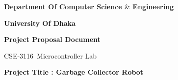 \documentclass[12pt]{article}
\begin{document}
\vspace{\baselineskip}
\vspace{\baselineskip}
\vspace{\baselineskip}
\vspace{\baselineskip}
\vspace{\baselineskip}
\vspace{\baselineskip}
\hspace{4 mm}
{\fontsize{22pt}{20.2pt}\selectfont \textbf{Department Of Computer Science $\&$  Engineering}\par}\par
\vspace{\baselineskip}
\vspace{\baselineskip}
\hspace{55 mm}
{\fontsize{22pt}{26.4pt}\selectfont \textbf{University Of Dhaka}\par}\par
\vspace{\baselineskip}

\vspace{\baselineskip}
\vspace{\baselineskip}
\vspace{\baselineskip}
\vspace{\baselineskip}
\vspace{\baselineskip}
\vspace{\baselineskip}
\vspace{\baselineskip}
\hspace{51 mm}
{\fontsize{18pt}{21.6pt}\selectfont \textbf{Project Proposal Document}\par}\par
\vspace{\baselineskip}

\vspace{\baselineskip}
\hspace{58 mm}
{\fontsize{15pt}{18.0pt}\selectfont CSE-3116\  Microcontroller Lab\par}\par
\vspace{\baselineskip}

\vspace{\baselineskip}
\vspace{\baselineskip}
\vspace{\baselineskip}
\vspace{\baselineskip}

\vspace{\baselineskip}
\vspace{\baselineskip}
\vspace{\baselineskip}
\hspace{6 mm}
{\fontsize{24pt}{28.8pt}\selectfont \textbf{Project Title : Garbage Collector Robot }\par}\par
\end{document}
